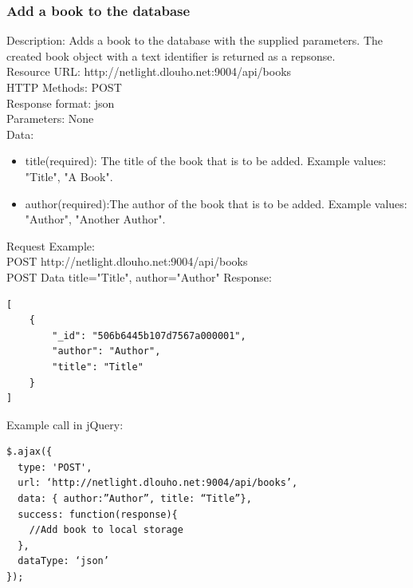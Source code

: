 \subsubsection{Add a book to the database}
Description: Adds a book to the database with the supplied parameters. The created book object with a text identifier is returned as a repsonse. 		\\
\newline
Resource URL: http://netlight.dlouho.net:9004/api/books	\\
HTTP Methods: POST		\\
Response format: json	\\
Parameters: None		\\
\newline
Data:
\begin{itemize}

\item title(required): The title of the book that is to be added. Example values: "Title", "A Book".

\item author(required):The author of the book that is to be added. Example values: "Author", "Another Author".

\end{itemize}
Request Example:		\\
POST		http://netlight.dlouho.net:9004/api/books	\\
POST Data	title="Title", author="Author"
\newline
Response:
\begin{verbatim}
[
    {
        "_id": "506b6445b107d7567a000001",
        "author": "Author",
        "title": "Title"
    }
]
\end{verbatim}
Example call in jQuery:
\begin{verbatim}
$.ajax({
  type: 'POST',
  url: ‘http://netlight.dlouho.net:9004/api/books’,
  data: { author:”Author”, title: “Title”},
  success: function(response){
  	//Add book to local storage
  },
  dataType: ‘json’
});
\end{verbatim}

